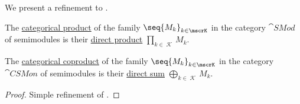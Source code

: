 \begin{proposition}\label{thm:semimodule_categorical_limits}
  We present a refinement to .

  \begin{thmenum}
     The \hyperref[def:discrete_category_limits]{categorical product} of the family \( \seq{ M_k }_{k \in \mscrK} \) in the category \hyperref[def:semimodule/category]{\( \cat{SMod} \)} of semimodules is their \hyperref[def:semimodule_direct_product]{direct product} \( \prod_{k \in \mscrK} M_k \).

     The \hyperref[def:discrete_category_limits]{categorical coproduct} of the family \( \seq{ M_k }_{k \in \mscrK} \) in the category \hyperref[def:semimodule/category]{\( \cat{CSMon} \)} of  semimodules is their \hyperref[def:semimodule_direct_product]{direct sum} \( \bigoplus_{k \in \mscrK} M_k \).
  \end{thmenum}
\end{proposition}
\begin{proof}
  Simple refinement of .
\end{proof}

